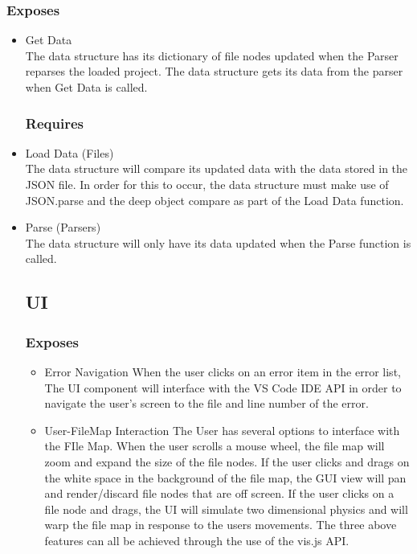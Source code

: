 \documentclass[letterpaper,10pt,titlepage,draftclsnofoot,onecolumn,onesided] {IEEEtran}
\begin{document}
		\subsubsection{Exposes}
		\begin{itemize}
			\item Get Data
			\\
			The data structure has its dictionary of file nodes updated when the Parser reparses the loaded project. 
			The data structure gets its data from the parser when Get Data is called.
		\subsubsection{Requires}
			\item Load Data (Files)
			\\
			The data structure will compare its updated data with the data stored in the JSON file. 
			In order for this to occur, the data structure must make use of JSON.parse and the deep object compare as part of the Load Data function. \cite{stringify}
			\item Parse (Parsers)
			\\
			The data structure will only have its data updated when the Parse function is called.

	\subsection{UI}
		\subsubsection{Exposes}
		\begin{itemize}
			\item Error Navigation 
			When the user clicks on an error item in the error list, The UI component will interface with the VS Code IDE API in order to navigate the user's screen to the file and line number of the error.
			\item User-FileMap Interaction
			The User has several options to interface with the FIle Map. 
			When the user scrolls a mouse wheel, the file map will zoom and expand the size of the file nodes.
			If the user clicks and drags on the white space in the background of the file map, the GUI view will pan and render/discard file nodes that are off screen.
			If the user clicks on a file node and drags, the UI will simulate two dimensional physics and will warp the file map in response to the users movements.
			The three above features can all be achieved through the use of the vis.js API.
		\end{itemize}
		

\end{itemize}
\end{document}
